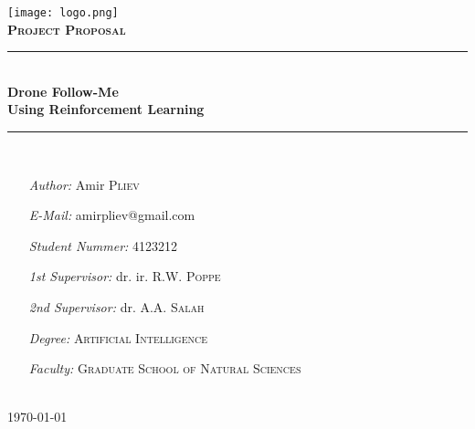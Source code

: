 
\begin{titlepage}

\newcommand{\HRule}{\rule{\linewidth}{0.5mm}} %

\center %
 

\texttt{[image: logo.png]}\\[1cm] %
\textsc{\Large \textbf{Project Proposal}}\\[0.5cm] %


\HRule \\[0.4cm]
{ \huge \bfseries Drone Follow-Me \\[0.3cm] Using Reinforcement Learning}\\[0.4cm] %
\HRule \\[1.0cm]
 

\begin{minipage}[t]{0.65\textwidth}
	\begin{itemize}
	\item[\emph{Author:}] Amir \textsc{Pliev}
	\item[\emph{E-Mail:}] amirpliev@gmail.com
	\item[\emph{Student Nummer:}] 4123212 
	\item[\emph{1st Supervisor:}] dr. ir. R.W. \textsc{Poppe}
	\item[\emph{2nd Supervisor:}] dr. A.A. \textsc{Salah}
	\item[\emph{Degree:}] \textsc{Artificial Intelligence}
	\item[\emph{Faculty:}]  \textsc{Graduate School of Natural Sciences}
	\end{itemize}
\end{minipage}\\[1.2cm]

{\large \today}\\[0.5cm]

\vfill %

\end{titlepage}
